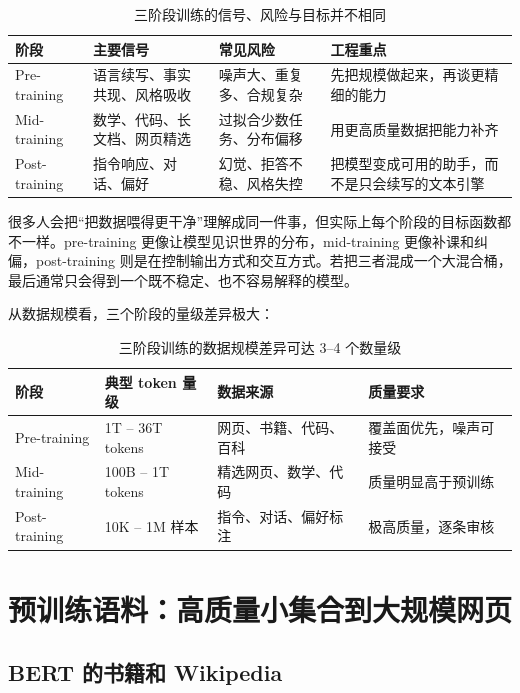 \documentclass[a4paper]{article}
\begin{document}
\begin{table}[H]
\centering
\begin{tabular}{p{}p{}p{}p{}}
\toprule
\textbf{阶段} & \textbf{主要信号} & \textbf{常见风险} & \textbf{工程重点} \\
\midrule
Pre-training & 语言续写、事实共现、风格吸收 & 噪声大、重复多、合规复杂 & 先把规模做起来，再谈更精细的能力 \\
Mid-training & 数学、代码、长文档、网页精选 & 过拟合少数任务、分布偏移 & 用更高质量数据把能力补齐 \\
Post-training & 指令响应、对话、偏好 & 幻觉、拒答不稳、风格失控 & 把模型变成可用的助手，而不是只会续写的文本引擎 \\
\bottomrule
\end{tabular}
\caption{三阶段训练的信号、风险与目标并不相同}
\end{table}

很多人会把“把数据喂得更干净”理解成同一件事，但实际上每个阶段的目标函数都不一样。pre-training 更像让模型见识世界的分布，mid-training 更像补课和纠偏，post-training 则是在控制输出方式和交互方式。若把三者混成一个大混合桶，最后通常只会得到一个既不稳定、也不容易解释的模型。

从数据规模看，三个阶段的量级差异极大：

\begin{table}[H]
\centering
\begin{tabular}{p{}p{}p{}p{}}
\toprule
\textbf{阶段} & \textbf{典型 token 量级} & \textbf{数据来源} & \textbf{质量要求} \\
\midrule
Pre-training & 1T -- 36T tokens & 网页、书籍、代码、百科 & 覆盖面优先，噪声可接受 \\
Mid-training & 100B -- 1T tokens & 精选网页、数学、代码 & 质量明显高于预训练 \\
Post-training & 10K -- 1M 样本 & 指令、对话、偏好标注 & 极高质量，逐条审核 \\
\bottomrule
\end{tabular}
\caption{三阶段训练的数据规模差异可达 3--4 个数量级}
\end{table}

\section{预训练语料：高质量小集合到大规模网页}

\subsection{BERT 的书籍和 Wikipedia}
\end{document}
